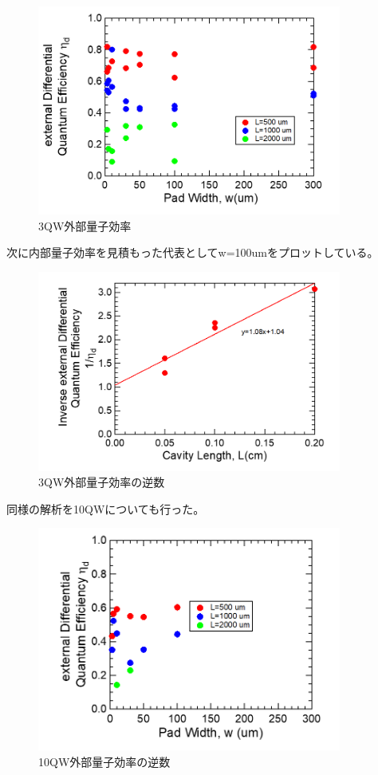 \begin{figure}[htbp]
	\centering
	\includegraphics[width=10cm]{figure/fig_3_1_3QW_broadcontact_id.png}
	\caption{3QW外部量子効率}
	\label{fig:fig_3_1_3QW_broadcontact_id}
\end{figure}
次に内部量子効率を見積もった代表としてw=100umをプロットしている。
\begin{figure}[htbp]
	\centering
	\includegraphics[width=10cm]{figure/fig_3_1_3QW_broadcontact_id_inverse.png}
	\caption{3QW外部量子効率の逆数}
	\label{fig:fig_3_1_3QW_broadcontact_id_inverse}
\end{figure}

同様の解析を10QWについても行った。
\begin{figure}[htbp]
	\centering
	\includegraphics[width=10cm]{figure/fig_3_1_10QW_broadcontact_id.png}
	\caption{10QW外部量子効率の逆数}
	\label{fig:fig_3_1_10QW_broadcontact_id}
\end{figure}

